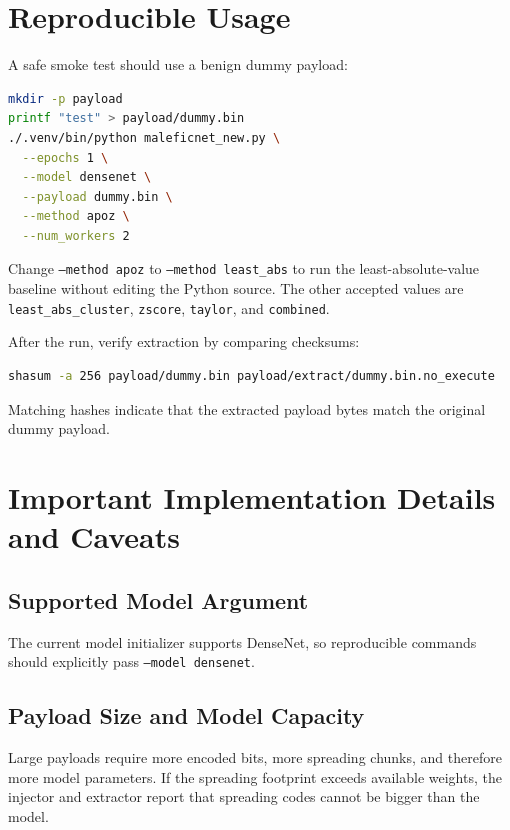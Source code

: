 \documentclass[11pt,a4paper]{article}
\newcommand{\code}[1]{\texttt{#1}}
\begin{document}
\section{Reproducible Usage}

A safe smoke test should use a benign dummy payload:

\begin{lstlisting}[language=bash]
mkdir -p payload
printf "test" > payload/dummy.bin
./.venv/bin/python maleficnet_new.py \
  --epochs 1 \
  --model densenet \
  --payload dummy.bin \
  --method apoz \
  --num_workers 2
\end{lstlisting}

Change \code{--method apoz} to \code{--method least\_abs} to run the least-absolute-value baseline without editing the Python source. The other accepted values are \code{least\_abs\_cluster}, \code{zscore}, \code{taylor}, and \code{combined}.

After the run, verify extraction by comparing checksums:

\begin{lstlisting}[language=bash]
shasum -a 256 payload/dummy.bin payload/extract/dummy.bin.no_execute
\end{lstlisting}

Matching hashes indicate that the extracted payload bytes match the original dummy payload.

\section{Important Implementation Details and Caveats}

\subsection{Supported Model Argument}

The current model initializer supports DenseNet, so reproducible commands should explicitly pass \code{--model densenet}.

\subsection{Payload Size and Model Capacity}

Large payloads require more encoded bits, more spreading chunks, and therefore more model parameters. If the spreading footprint exceeds available weights, the injector and extractor report that spreading codes cannot be bigger than the model.
\end{document}
